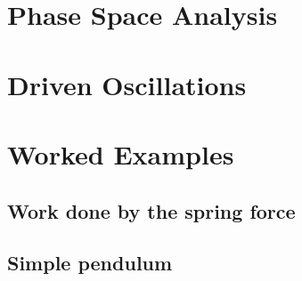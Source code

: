 \documentclass[../main.tex]{subfiles}
\begin{document}
\section{Phase Space Analysis}

\section{Driven Oscillations}


\section{Worked Examples}
\subsection{Work done by the spring force}
\subsection{Simple pendulum}
\end{document}
